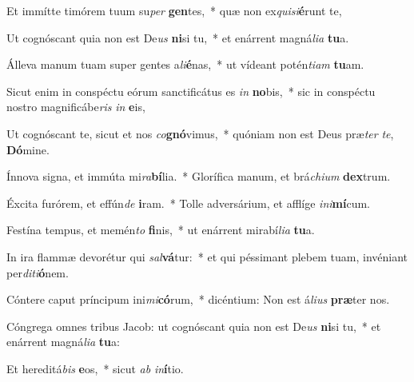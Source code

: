 \item Et immítte timórem tuum su\textit{per} \textbf{gen}tes,~* quæ non ex\textit{qui}\textit{si}\textbf{é}runt te,
\item Ut cognóscant quia non est De\textit{us} \textbf{ni}si tu,~* et enárrent magná\textit{li}\textit{a} \textbf{tu}a.
\item Álleva manum tuam super gentes a\textit{li}\textbf{é}nas,~* ut vídeant potén\textit{ti}\textit{am} \textbf{tu}am.
\item Sicut enim in conspéctu eórum sanctificátus es \textit{in} \textbf{no}bis,~* sic in conspéctu nostro magnificábe\textit{ris} \textit{in} \textbf{e}is,
\item Ut cognóscant te, sicut et nos \textit{co}\textbf{gnó}vimus,~* quóniam non est Deus præ\textit{ter} \textit{te}, \textbf{Dó}mine.
\item Ínnova signa, et immúta mi\textit{ra}\textbf{bí}lia.~* Glorífica manum, et brá\textit{chi}\textit{um} \textbf{dex}trum.
\item Éxcita furórem, et effún\textit{de} \textbf{i}ram.~* Tolle adversárium, et afflíge \textit{in}\textit{i}\textbf{mí}cum.
\item Festína tempus, et memén\textit{to} \textbf{fi}nis,~* ut enárrent mirabí\textit{li}\textit{a} \textbf{tu}a.
\item In ira flammæ devorétur qui \textit{sal}\textbf{vá}tur:~* et qui péssimant plebem tuam, invéniant per\textit{di}\textit{ti}\textbf{ó}nem.
\item Cóntere caput príncipum ini\textit{mi}\textbf{có}rum,~* dicéntium: Non est á\textit{li}\textit{us} \textbf{præ}ter nos.
\item Cóngrega omnes tribus Jacob: ut cognóscant quia non est De\textit{us} \textbf{ni}si tu,~* et enárrent magná\textit{li}\textit{a} \textbf{tu}a:
\item Et hereditá\textit{bis} \textbf{e}os,~* sicut \textit{ab} \textit{in}\textbf{í}tio.
